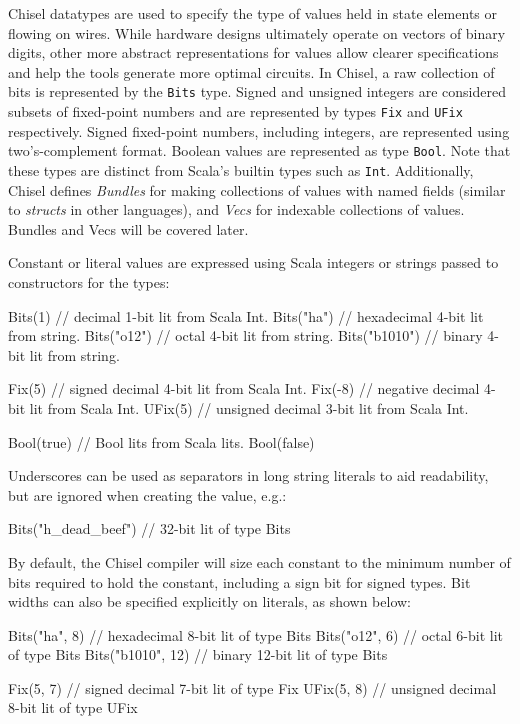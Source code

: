 \documentclass[twocolumn,10pt]{article}
\def\code#1{{\tt #1}}
\begin{document}
Chisel datatypes are used to specify the type of values held in state
elements or flowing on wires.  While hardware designs ultimately
operate on vectors of binary digits, other more abstract
representations for values allow clearer specifications and help the
tools generate more optimal circuits.  In Chisel, a raw collection of
bits is represented by the \code{Bits} type.  Signed and unsigned integers
are considered subsets of fixed-point numbers and are represented by
types \code{Fix} and \code{UFix} respectively. Signed fixed-point
numbers, including integers, are represented using two's-complement
format.  Boolean values are represented as type \code{Bool}.  Note
that these types are distinct from Scala's builtin types such as
\code{Int}.  Additionally, Chisel defines {\em Bundles} for making
collections of values with named fields (similar to {\em structs} in
other languages), and {\em Vecs} for indexable collections of
values.  Bundles and Vecs will be covered later.

Constant or literal values are expressed using Scala integers or
strings passed to constructors for the types:
\begin{scala}
Bits(1)       // decimal 1-bit lit from Scala Int.
Bits("ha")    // hexadecimal 4-bit lit from string.
Bits("o12")   // octal 4-bit lit from string.
Bits("b1010") // binary 4-bit lit from string.

Fix(5)     // signed decimal 4-bit lit from Scala Int.
Fix(-8)    // negative decimal 4-bit lit from Scala Int.
UFix(5)    // unsigned decimal 3-bit lit from Scala Int.

Bool(true) // Bool lits from Scala lits.
Bool(false)
\end{scala}

Underscores can be used as separators in long string literals to aid
readability, but are ignored when creating the value, e.g.:
\begin{scala}
Bits("h_dead_beef")   // 32-bit lit of type Bits
\end{scala}

By default, the Chisel compiler will size each constant to the minimum
number of bits required to hold the constant, including a sign bit for
signed types.  Bit widths can also be specified explicitly on
literals, as shown below:
\begin{scala}
Bits("ha", 8)     // hexadecimal 8-bit lit of type Bits
Bits("o12", 6)    // octal 6-bit lit of type Bits
Bits("b1010", 12) // binary 12-bit lit of type Bits

Fix(5, 7)  // signed decimal 7-bit lit of type Fix
UFix(5, 8) // unsigned decimal 8-bit lit of type UFix
\end{scala}
\end{document}
